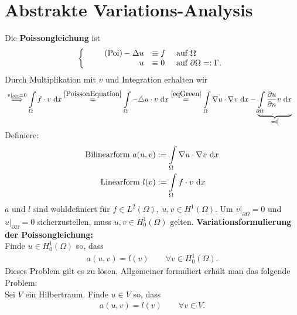 
\section{Abstrakte Variations-Analysis}
Die \textbf{Poissongleichung} ist
\begin{align}
	\left\{
	\begin{array}{r l l}\label{PoissonEquation}\tag{Poi}
		-\Delta u &\equiv f &\text{ auf }\Omega \\
		u &\equiv 0 &\text{ auf }\partial\Omega=:\Gamma.
	\end{array}\right.
\end{align}
Durch Multiplikation mit $v$ und Integration erhalten wir
\begin{align*}
	&\stackrel{ v|_{\partial\Omega}\equiv0}{\implies}
	\int\limits_\Omega f\cdot v\text{ d} x
	\overset{\eqref{PoissonEquation}}=
	\int\limits_\Omega-\triangle u\cdot v\text{ d} x
	\overset{\eqref{eqGreen}}=
	\int\limits_\Omega\nabla u\cdot\nabla v\text{ d} x-\underbrace{\int\limits_{\partial\Omega}\frac{\partial u}{\partial n}v\text{ d} x}_{=0}
\end{align*}
Definiere:
\begin{align*}
	\text{Bilinearform } a(u,v)&:=\int\limits_\Omega\nabla u\cdot\nabla v\text{ d} x\\
	\text{Linearform } l(v)&:=\int\limits_\Omega f\cdot v\text{ d} x
\end{align*}
$a$ und $l$ sind wohldefiniert für $f\in L^2(\Omega),~u,v\in H^1(\Omega)$.
Um $v|_{\partial\Omega}=0$ und $u|_{\partial\Omega}=0$ sicherzustellen, muss $u,v\in H^1_0(\Omega)$ gelten.\nl
\textbf{Variationsformulierung der Poissongleichung:}\\
Finde $u\in H_0^1(\Omega)$ so, dass
\begin{align*}
	a(u,v)=l(v)\qquad\forall v\in H^1_0(\Omega).
\end{align*}
Dieses Problem gilt es zu lösen.
Allgemeiner formuliert erhält man das folgende Problem:\\
Sei $V$ ein Hilbertraum. Finde $u\in V$ so, dass
\begin{align*}
	a(u,v)=l(v)\qquad\forall v\in V.
\end{align*}

